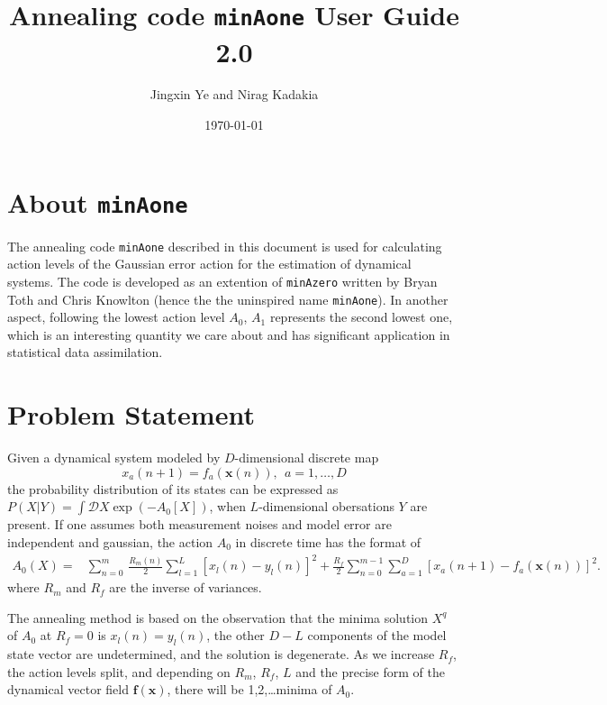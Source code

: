 \documentclass[11pt]{article}
\title{\textbf{Annealing code \texttt{minAone} User Guide} 2.0}
\author{Jingxin Ye and Nirag Kadakia}
\date{\today}
\begin{document}
\maketitle
\tableofcontents
\newpage
\section{About \texttt{minAone}}
The annealing code \texttt{minAone} described in this document is used for calculating action levels of the Gaussian error action for the estimation of dynamical systems. The code is developed as an extention of \texttt{minAzero} written by Bryan Toth and Chris Knowlton (hence the the uninspired name \texttt{minAone}). In another aspect, following the lowest action level $A_0$, $A_1$ represents the second lowest one, which is an interesting quantity we care about and has significant application in statistical data assimilation.
\section{Problem Statement}
Given a dynamical system modeled by $D$-dimensional discrete map
\[{x_a}(n+1)=f_a(\mathbf{x}(n)),~~a=1,\dots,D\]
the probability distribution of its states can be expressed as $P(X|Y)=\int \mathcal {D}X \exp(-A_0[X])$, when $L$-dimensional obersations $Y$ are present.  If one assumes both measurement noises and model error are independent and gaussian, the action $A_0$ in discrete time has the format of
\begin{align}
A_0(X) = &\sum_{n=0}^m\, \frac{R_m(n)}{2} \sum_{l=1}^L [x_l(n) - y_l(n)]^2 +  \frac{R_f}{2} \sum_{n=0}^{m-1} \sum_{a=1}^D[x_a(n+1) - f_a(\mathbf{x}(n))]^2 .
\label{eq:actionform}
\end{align}
where $R_m$ and $R_f$ are the inverse of variances.

The annealing method is based on the observation that the minima solution $X^q$ of $A_0$ at $R_f=0$ is $x_l(n)=y_l(n)$, the other $D-L$ components of the model state vector are undetermined, and the solution is degenerate. As we increase $R_f$, the action levels split, and depending on $R_m$, $R_f$, $L$ and the precise form of the dynamical vector field $\mathbf{f}(\mathbf{x})$, there will be 1,2,\dots minima of $A_0$.
\end{document}
